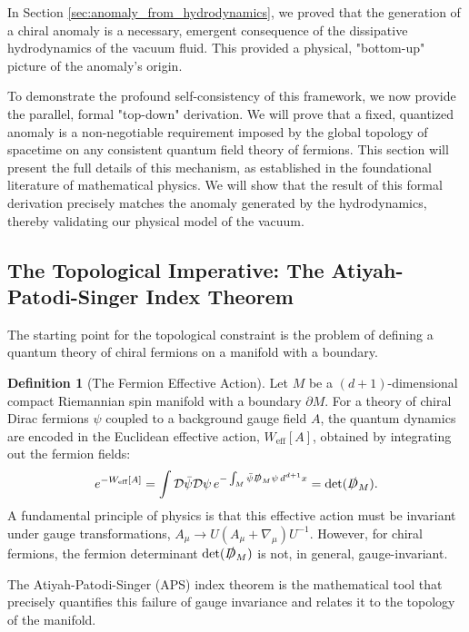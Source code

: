 \documentclass[11pt, letterpaper]{report}
\theoremstyle{plain} %
\theoremstyle{definition} %
\newtheorem{definition}{Definition}[chapter]
\theoremstyle{remark} %
\newcommand{\BulkM}{M}
\newcommand{\BoundaryM}{\partial\BulkM}
\newcommand{\DiracOpBulk}{\slashed{D}_{\BulkM}}
\begin{document}
In Section \ref{sec:anomaly_from_hydrodynamics}, we proved that the generation of a chiral anomaly is a necessary, emergent consequence of the dissipative hydrodynamics of the vacuum fluid. This provided a physical, "bottom-up" picture of the anomaly's origin.

To demonstrate the profound self-consistency of this framework, we now provide the parallel, formal "top-down" derivation. We will prove that a fixed, quantized anomaly is a non-negotiable requirement imposed by the global topology of spacetime on any consistent quantum field theory of fermions. This section will present the full details of this mechanism, as established in the foundational literature of mathematical physics. We will show that the result of this formal derivation precisely matches the anomaly generated by the hydrodynamics, thereby validating our physical model of the vacuum.

\subsection{The Topological Imperative: The Atiyah-Patodi-Singer Index Theorem}
\label{subsec:aps_theorem_formal}

The starting point for the topological constraint is the problem of defining a quantum theory of chiral fermions on a manifold with a boundary.

\begin{definition}[The Fermion Effective Action]
Let $\BulkM$ be a $(d+1)$-dimensional compact Riemannian spin manifold with a boundary $\BoundaryM$. For a theory of chiral Dirac fermions $\psi$ coupled to a background gauge field $A$, the quantum dynamics are encoded in the Euclidean effective action, $W_{\text{eff}}[A]$, obtained by integrating out the fermion fields:
\begin{equation}
    e^{-W_{\text{eff}}[A]} = \int \mathcal{D}\bar{\psi}\mathcal{D}\psi \, e^{-\int_{\BulkM} \bar{\psi} \DiracOpBulk \psi \, d^{d+1}x} = \det(\DiracOpBulk).
\end{equation}
A fundamental principle of physics is that this effective action must be invariant under gauge transformations, $A_\mu \to U(A_\mu + \nabla_\mu)U^{-1}$. However, for chiral fermions, the fermion determinant $\det(\DiracOpBulk)$ is not, in general, gauge-invariant.
\end{definition}

The Atiyah-Patodi-Singer (APS) index theorem is the mathematical tool that precisely quantifies this failure of gauge invariance and relates it to the topology of the manifold.
\end{document}
